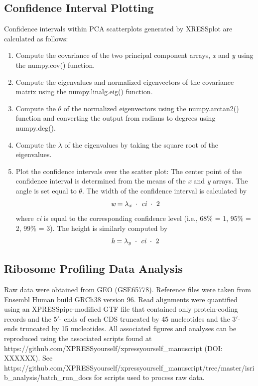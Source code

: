 \documentclass[10pt, oneside]{article}
\begin{document}
\subsection{Confidence Interval Plotting}
Confidence intervals within PCA scatterplots generated by XRESSplot are calculated as follows:

\begin{enumerate}
  \item Compute the covariance of the two principal component arrays, \textit{x} and \textit{y} using the numpy.cov() function.

  \item Compute the eigenvalues and normalized eigenvectors of the covariance matrix using the numpy.linalg.eig() function.

  \item Compute the $\theta$ of the normalized eigenvectors using the numpy.arctan2() function and converting the output from radians to degrees using numpy.deg().

  \item Compute the $\lambda$ of the eigenvalues by taking the square root of the eigenvalues.

  \item Plot the confidence intervals over the scatter plot: The center point of the confidence interval is determined from the means of the \textit{x} and \textit{y} arrays. The angle is set equal to $\theta$. The width of the confidence interval is calculated by
  \[
  \textit{w} = \lambda _{\textit{\scriptsize{x}}}\ \cdot\ \textit{ci}\ \cdot\ 2
  \]
  where \textit{ci} is equal to the corresponding confidence level (i.e., 68\% = 1, 95\% = 2, 99\% = 3). The height is similarly computed by
  \[
  \textit{h} = \lambda _{\textit{\scriptsize{y}}}\ \cdot\ \textit{ci}\ \cdot\ 2
  \]
\end{enumerate}

\subsection{Ribosome Profiling Data Analysis}
Raw data were obtained from GEO (GSE65778). Reference files were taken from Ensembl Human build GRCh38 version 96. Read alignments were quantified using an XPRESSpipe-modified GTF file that contained only protein-coding records and the $5'$- ends of each CDS truncated by 45 nucleotides and the $3'$- ends truncated by 15 nucleotides. All associated figures and analyses can be reproduced using the associated scripts found at https://github.com/XPRESSyourself/xpressyourself\_manuscript (DOI: XXXXXX). See https://github.com/XPRESSyourself/xpressyourself\_manuscript/tree/master/isrib\_analysis/batch\_run\_docs for scripts used to process raw data. \par
\end{document}

